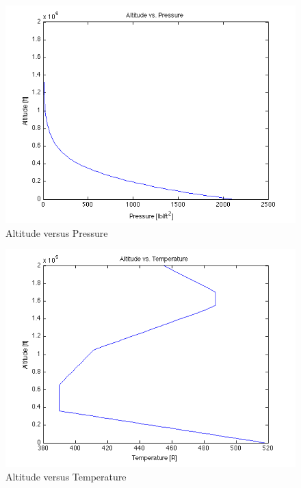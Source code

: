 \documentclass[12pt]{report}
\begin{document}
\begin{figure}[here]
\includegraphics[width=1\textwidth]{AltitudeVsPressure.png}
\caption{Altitude versus Pressure}
\label{fig:Figure1}
\end{figure}

\begin{figure}[here]
\includegraphics[width=1\textwidth]{AltitudeVsTemperature.png}
\caption{Altitude versus Temperature}
\label{fig:Figure2}
\end{figure}
\end{document}
